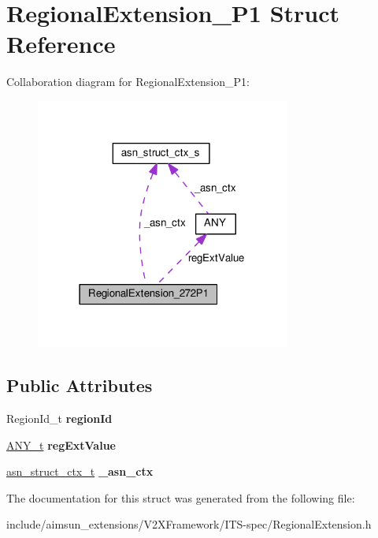 \hypertarget{structRegionalExtension__272P1}{}\section{Regional\+Extension\+\_\+P1 Struct Reference}
\label{structRegionalExtension__272P1}


Collaboration diagram for Regional\+Extension\+\_\+P1\+:\nopagebreak
\begin{figure}[H]
\begin{center}
\leavevmode
\includegraphics[width=238pt]{structRegionalExtension__272P1__coll__graph}
\end{center}
\end{figure}
\subsection*{Public Attributes}
\begin{DoxyCompactItemize}
\item 
Region\+Id\+\_\+t {\bfseries region\+Id}\hypertarget{structRegionalExtension__272P1_a032761d424eb7236f9f1e710eb3fd4ff}{}\label{structRegionalExtension__272P1_a032761d424eb7236f9f1e710eb3fd4ff}

\item 
\hyperlink{structANY}{A\+N\+Y\+\_\+t} {\bfseries reg\+Ext\+Value}\hypertarget{structRegionalExtension__272P1_aefb057d25563a68d439f835af8905e3f}{}\label{structRegionalExtension__272P1_aefb057d25563a68d439f835af8905e3f}

\item 
\hyperlink{structasn__struct__ctx__s}{asn\+\_\+struct\+\_\+ctx\+\_\+t} {\bfseries \+\_\+asn\+\_\+ctx}\hypertarget{structRegionalExtension__272P1_ab8c0f057d2b9468d17f7fe115e9b6828}{}\label{structRegionalExtension__272P1_ab8c0f057d2b9468d17f7fe115e9b6828}

\end{DoxyCompactItemize}


The documentation for this struct was generated from the following file\+:\begin{DoxyCompactItemize}
\item 
include/aimsun\+\_\+extensions/\+V2\+X\+Framework/\+I\+T\+S-\/spec/Regional\+Extension.\+h\end{DoxyCompactItemize}
